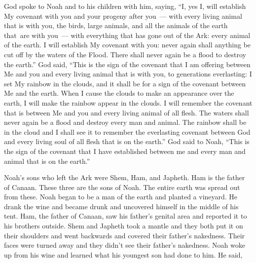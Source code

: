 \begin{inparaenum}
   God spoke to Noah and to his children with him, saying,%
   ``I, yes I, will establish My covenant with you and your progeny after you~---%
   with every living animal that is with you, the birds, large animals, and all the animals of the earth that\understood\ are with you~--- with everything that has gone out of the Ark: every animal of the earth.%
   I will establish My covenant with you: never again shall anything be cut off by the waters of the Flood. There shall never again be a flood to destroy the earth.''%
   God said, ``This is the sign of the covenant that I am offering between Me and you and every living animal that is with you, to generations everlasting:%
   I set My rainbow in the clouds, and it shall be for a sign of the covenant between Me and the earth.%
   When I cause the clouds to make an appearance over the earth, I will make the rainbow appear in the clouds.%
   I will remember the covenant that is between Me and you and every living animal of all flesh. The waters shall never again be a flood and destroy every man and animal.%
   The rainbow shall be in the cloud and I shall see it to remember the everlasting covenant between God and every living soul of all flesh that is on the earth.''%
   God said to Noah, ``This is the sign of the covenant that I have established between me and every man and animal that is on the earth.''%
  
   Noah's sons who left the Ark were Shem, Ham, and Japheth. Ham is the father of Canaan.%
   These three are the sons of Noah. The entire earth was spread out from these.%
   Noah began to be a man of the earth and planted a vineyard.%
   He drank the wine and became drunk and uncovered himself in the middle of his tent.%
   Ham, the father of Canaan, saw his father's genital area and reported it to his brothers outside.%
   Shem and Japheth took a mantle and they both put it on their shoulders and went backwards and covered their father's nakedness. Their faces were turned away and they didn't see their father's nakedness.%
   Noah woke up from his wine and learned what his youngest son had done to him.%
   He said,%
  

\end{inparaenum}
